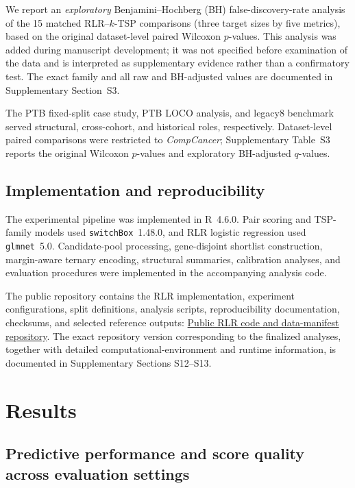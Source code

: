 \documentclass[preprint,12pt,a4paper]{elsarticle}
\begin{document}
We report an \emph{exploratory} Benjamini--Hochberg (BH) false-discovery-rate analysis \cite{Benjamini1995} of the 15 matched RLR--$k$-TSP comparisons (three target sizes by five metrics), based on the original dataset-level paired Wilcoxon $p$-values. This analysis was added during manuscript development; it was not specified before examination of the data and is interpreted as supplementary evidence rather than a confirmatory test. The exact family and all raw and BH-adjusted values are documented in Supplementary Section~S3.

The PTB fixed-split case study, PTB LOCO analysis, and legacy8 benchmark served structural, cross-cohort, and historical roles, respectively. Dataset-level paired comparisons were restricted to \emph{CompCancer}; Supplementary Table~S3 reports the original Wilcoxon $p$-values and exploratory BH-adjusted $q$-values.

\subsection{Implementation and reproducibility}

The experimental pipeline was implemented in R~4.6.0. Pair scoring and TSP-family models used \texttt{switchBox}~1.48.0, and RLR logistic regression used \texttt{glmnet}~5.0. Candidate-pool processing, gene-disjoint shortlist construction, margin-aware ternary encoding, structural summaries, calibration analyses, and evaluation procedures were implemented in the accompanying analysis code.

The public repository contains the RLR implementation, experiment configurations, split definitions, analysis scripts, reproducibility documentation, checksums, and selected reference outputs:
\href{https://github.com/mczajkowskipb/relative-logistic-regression}{Public RLR code and data-manifest repository}.
The exact repository version corresponding to the finalized analyses, together with detailed computational-environment and runtime information, is documented in Supplementary Sections S12--S13.

\section{Results}\label{sec:results}

\subsection{Predictive performance and score quality across evaluation settings}
\end{document}
